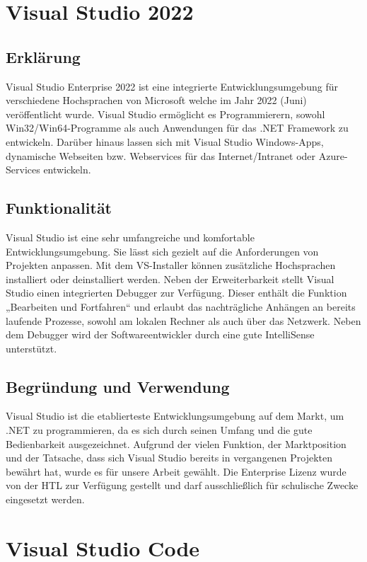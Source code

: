 \section{Visual Studio 2022}
\author{Mirzet sakonjic}
\subsection*{Erklärung}
Visual Studio Enterprise 2022 ist eine integrierte Entwicklungsumgebung für verschiedene Hochsprachen von Microsoft welche im Jahr 2022 (Juni) veröffentlicht wurde.
Visual Studio ermöglicht es Programmierern, sowohl Win32/Win64-Programme als
auch Anwendungen für das .NET Framework zu entwickeln. Darüber hinaus lassen sich
mit Visual Studio Windows-Apps, dynamische Webseiten bzw. Webservices für das
Internet/Intranet oder Azure-Services entwickeln.
\subsection*{Funktionalität}
Visual Studio ist eine sehr umfangreiche und komfortable Entwicklungsumgebung. Sie
lässt sich gezielt auf die Anforderungen von Projekten anpassen. Mit dem VS-Installer
können zusätzliche Hochsprachen installiert oder deinstalliert werden.
Neben der Erweiterbarkeit stellt Visual Studio einen integrierten Debugger zur Verfügung. Dieser enthält die Funktion „Bearbeiten und Fortfahren“ und erlaubt das
nachträgliche Anhängen an bereits laufende Prozesse, sowohl am lokalen Rechner als
auch über das Netzwerk. Neben dem Debugger wird der Softwareentwickler durch eine
gute IntelliSense unterstützt.
\subsection*{Begründung und Verwendung}
Visual Studio ist die etablierteste Entwicklungsumgebung auf dem Markt, um .NET
zu programmieren, da es sich durch seinen Umfang und die gute Bedienbarkeit ausgezeichnet. Aufgrund der vielen Funktion, der Marktposition und der Tatsache, dass
sich Visual Studio bereits in vergangenen Projekten bewährt hat, wurde es für unsere
Arbeit gewählt. Die Enterprise Lizenz wurde von der HTL zur Verfügung gestellt und
darf ausschließlich für schulische Zwecke eingesetzt werden.


\section{Visual Studio Code}
\author{Stefano Pyringer}

